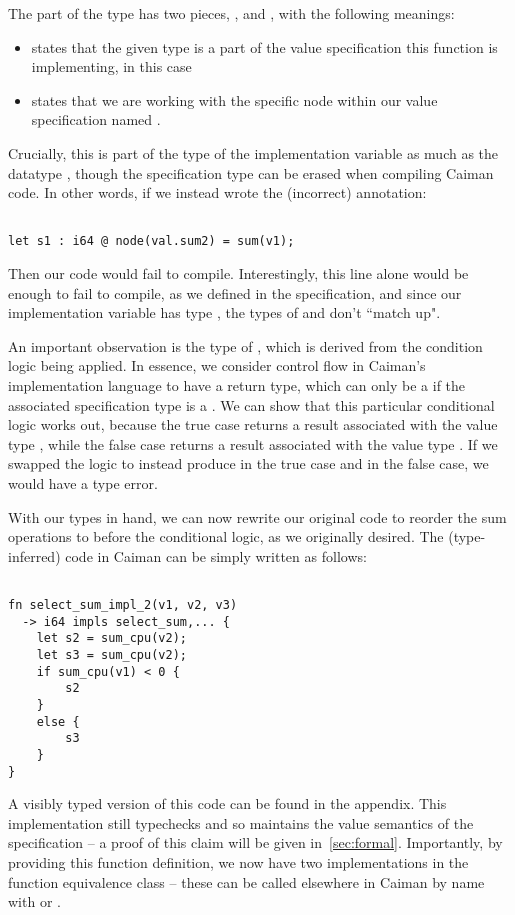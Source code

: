 The part of the type  has two pieces, , and , with the following meanings:
%
\begin{itemize}
\item {} states that the given type is a part of the value specification this function is implementing,  in this case
\item {} states that we are working with the specific node within our value specification named .
\end{itemize}
%
Crucially, this is part of the type of the implementation variable as much as the datatype , though the specification type can be erased when compiling Caiman code.  In other words, if we instead wrote the (incorrect) annotation:
%
\begin{lstlisting}

let s1 : i64 @ node(val.sum2) = sum(v1);
\end{lstlisting}
%
Then our code would fail to compile.  Interestingly, this line alone would be enough to fail to compile, as we defined  in the specification, and since our implementation variable  has type , the types of  and  don't ``match up".

An important observation is the type of , which is derived from the  condition logic being applied.  In essence, we consider control flow in Caiman's implementation language to have a return type, which can only be a  if the associated specification type is a .  We can show that this particular conditional logic works out, because the true case returns a result associated with the value type , while the false case returns a result associated with the value type .  If we swapped the logic to instead produce  in the true case and  in the false case, we would have a type error.

With our types in hand, we can now rewrite our original code to reorder the sum operations to before the conditional logic, as we originally desired.  The (type-inferred) code in Caiman can be simply written as follows:
%
\begin{lstlisting}

fn select_sum_impl_2(v1, v2, v3) 
  -> i64 impls select_sum,... {
    let s2 = sum_cpu(v2);
    let s3 = sum_cpu(v2);
    if sum_cpu(v1) < 0 {
        s2
    }
    else {
        s3
    }
}
\end{lstlisting}
%
A visibly typed version of this code can be found in the appendix.  This implementation still typechecks and so maintains the value semantics of the  specification -- a proof of this claim will be given in~\ref{sec:formal}.  Importantly, by providing this function definition, we now have two implementations in the  function equivalence class -- these can be called elsewhere in Caiman by name with  or .


